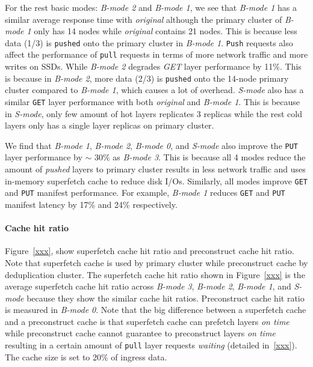 For the rest basic modes: \emph{B-mode 2} and \emph{B-mode 1},
we see that \emph{B-mode 1} has a similar average response time with \emph{original}
although the primary cluster of \emph{B-mode 1} only has 14 nodes while 
\emph{original} contains 21 nodes.
This is because less data (1/3) is \texttt{pushed} onto the primary cluster in \emph{B-mode 1}.
\texttt{Push} requests also affect the performance of \texttt{pull} requests
in terms of more network traffic and more writes on SSDs.
While \emph{B-mode 2} degrades \emph{GET} layer performance by 11\%.
This is because 
in \emph{B-mode 2},
more data (2/3) is \texttt{pushed} onto the 14-node primary cluster compared to \emph{B-mode 1},
which causes a lot of overhead.
\emph{S-mode} also has a similar \texttt{GET} layer performance with both \emph{original} and \emph{B-mode 1}.
This is because in \emph{S-mode}, only few amount of hot layers replicates 3 replicas while
the rest cold layers only has a single layer replicas on primary cluster. 

We find that
\emph{B-mode 1}, \emph{B-mode 2}, \emph{B-mode 0}, and \emph{S-mode}
 also improve the \texttt{PUT} layer performance by $\sim$ 30\% as \emph{B-mode 3}.
This is because
all 4 modes reduce the amount of \emph{pushed} layers to primary cluster results in
less network traffic and uses in-memory superfetch cache to reduce disk I/Os.
Similarly,
all modes improve \texttt{GET} and \texttt{PUT} manifest performance.
For example, \emph{B-mode 1} reduces \texttt{GET} and \texttt{PUT}
manifest latency by 17\% and 24\% respectively.

\paragraph{Cache hit ratio}

Figure~\ref{xxx},
show superfetch cache hit ratio and preconstruct cache hit ratio.
Note that superfetch cache is used by primary cluster while preconstruct cache by deduplication cluster.
The superfetch cache hit ratio shown in Figure~\ref{xxx}
is the average superfetch cache hit ratio across \emph{B-mode 3}, \emph{B-mode 2}, \emph{B-mode 1}, and \emph{S-mode}
because they show the similar cache hit ratios.
Preconstruct cache hit ratio is measured in \emph{B-mode 0}.
Note that the big difference between a superfetch cache and a preconstruct cache 
is that superfetch cache can prefetch layers \emph{on time}
while preconstruct cache cannot guarantee to preconstruct layers \emph{on time} resulting in
a certain amount of \texttt{pull} layer requests \emph{waiting} (detailed in~\ref{xxx}).
The cache size is set to 20\% of ingress data.

